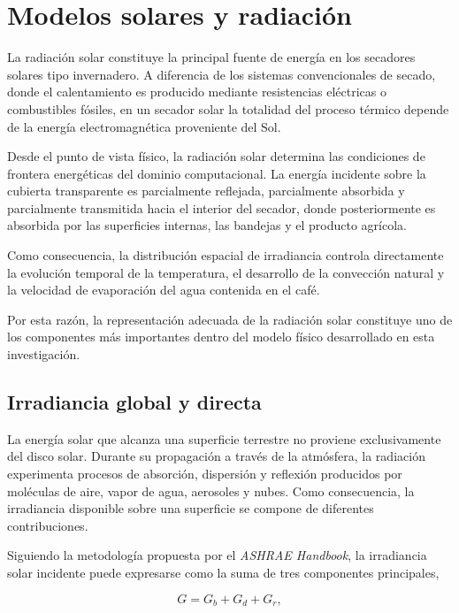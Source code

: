 \section{Modelos solares y radiación}

La radiación solar constituye la principal fuente de energía en los secadores solares tipo invernadero. A diferencia de los sistemas convencionales de secado, donde el calentamiento es producido mediante resistencias eléctricas o combustibles fósiles, en un secador solar la totalidad del proceso térmico depende de la energía electromagnética proveniente del Sol.

Desde el punto de vista físico, la radiación solar determina las condiciones de frontera energéticas del dominio computacional. La energía incidente sobre la cubierta transparente es parcialmente reflejada, parcialmente absorbida y parcialmente transmitida hacia el interior del secador, donde posteriormente es absorbida por las superficies internas, las bandejas y el producto agrícola.

Como consecuencia, la distribución espacial de irradiancia controla directamente la evolución temporal de la temperatura, el desarrollo de la convección natural y la velocidad de evaporación del agua contenida en el café.

Por esta razón, la representación adecuada de la radiación solar constituye uno de los componentes más importantes dentro del modelo físico desarrollado en esta investigación.

\subsection{Irradiancia global y directa}

La energía solar que alcanza una superficie terrestre no proviene exclusivamente del disco solar. Durante su propagación a través de la atmósfera, la radiación experimenta procesos de absorción, dispersión y reflexión producidos por moléculas de aire, vapor de agua, aerosoles y nubes. Como consecuencia, la irradiancia disponible sobre una superficie se compone de diferentes contribuciones.

Siguiendo la metodología propuesta por el \textit{ASHRAE Handbook}, la irradiancia solar incidente puede expresarse como la suma de tres componentes principales,

\begin{equation}
G=
G_b
+
G_d
+
G_r,
\label{eq:globalirradiance}
\end{equation}

